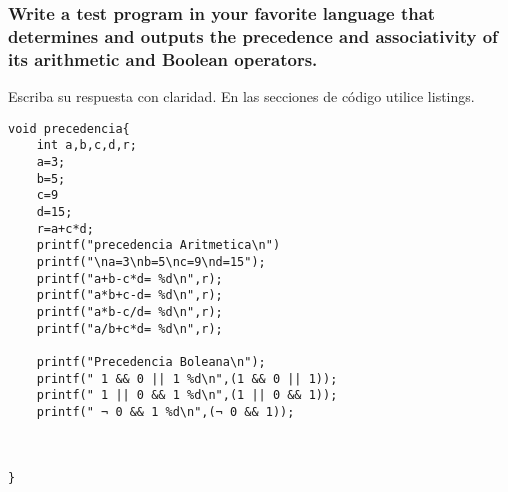\subsubsection{Write a test program in your favorite language that determines and 
outputs the precedence and associativity of its arithmetic and Boolean 
operators.}

Escriba su respuesta con claridad. En las secciones de código utilice listings.

\lstset{language = C} 
\begin{lstlisting}[frame = single] %Comienzo del Código
void precedencia{
	int a,b,c,d,r;
	a=3;
	b=5;
	c=9
	d=15;
	r=a+c*d;
	printf("precedencia Aritmetica\n")
	printf("\na=3\nb=5\nc=9\nd=15");
	printf("a+b-c*d= %d\n",r);
	printf("a*b+c-d= %d\n",r);
	printf("a*b-c/d= %d\n",r);
	printf("a/b+c*d= %d\n",r);
	
	printf("Precedencia Boleana\n");
	printf(" 1 && 0 || 1 %d\n",(1 && 0 || 1));
	printf(" 1 || 0 && 1 %d\n",(1 || 0 && 1));
	printf(" ¬ 0 && 1 %d\n",(¬ 0 && 1));
	
	
	
}
	
\end{lstlisting}
